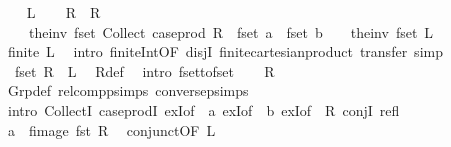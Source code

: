 \begin{isabellebody}
%
\isadelimproof
%
\endisadelimproof
%
\isatagproof
{}\isamarkupfalse%
\isanewline
\ \ \isamarkupfalse%
\ {\isacharquery}L\isanewline
\ \ \isamarkupfalse%
\ R{\isacharprime}\ \ {\isachardoublequoteopen}R{\isacharprime}\ {\isacharequal}\isanewline
\ \ \ \ the{\isacharunderscore}inv\ fset\ {\isacharparenleft}Collect\ {\isacharparenleft}case{\isacharunderscore}prod\ R{\isacharparenright}\ {\isasyminter}\ {\isacharparenleft}fset\ a\ {\isasymtimes}\ fset\ b{\isacharparenright}{\isacharparenright}{\isachardoublequoteclose}\ {\isacharparenleft}\ {\isachardoublequoteopen}{\isacharunderscore}\ {\isacharequal}\ the{\isacharunderscore}inv\ fset\ {\isacharquery}L{\isacharprime}{\isachardoublequoteclose}{\isacharparenright}\isanewline
\ \ \isamarkupfalse%
\ {\isachardoublequoteopen}finite\ {\isacharquery}L{\isacharprime}{\isachardoublequoteclose}\ \isamarkupfalse%
\ {\isacharparenleft}intro\ finite{\isacharunderscore}Int{\isacharbrackleft}OF\ disjI{}{\isacharbrackright}\ finite{\isacharunderscore}cartesian{\isacharunderscore}product{\isacharparenright}\ {\isacharparenleft}transfer{\isacharcomma}\ simp{\isacharparenright}{\isacharplus}\isanewline
\ \ \isamarkupfalse%
\ {\isacharasterisk}{\isacharcolon}\ {\isachardoublequoteopen}fset\ R{\isacharprime}\ {\isacharequal}\ {\isacharquery}L{\isacharprime}{\isachardoublequoteclose}\ \isamarkupfalse%
\ R{\isacharprime}{\isacharunderscore}def\ \isamarkupfalse%
\ {\isacharparenleft}intro\ fset{\isacharunderscore}to{\isacharunderscore}fset{\isacharparenright}\isanewline
\ \ \isamarkupfalse%
\ {\isacharquery}R\ \isamarkupfalse%
\ Grp{\isacharunderscore}def\ relcompp{\isachardot}simps\ conversep{\isachardot}simps\isanewline
\ \ \isamarkupfalse%
\ {\isacharparenleft}intro\ CollectI\ case{\isacharunderscore}prodI\ exI{\isacharbrackleft}of\ {\isacharunderscore}\ a{\isacharbrackright}\ exI{\isacharbrackleft}of\ {\isacharunderscore}\ b{\isacharbrackright}\ exI{\isacharbrackleft}of\ {\isacharunderscore}\ R{\isacharprime}{\isacharbrackright}\ conjI\ refl{\isacharparenright}\isanewline
\ \ \ \ \isamarkupfalse%
\ {\isacharasterisk}\ \isamarkupfalse%
\ {\isachardoublequoteopen}a\ {\isacharequal}\ fimage\ fst\ R{\isacharprime}{\isachardoublequoteclose}\ \isamarkupfalse%
\ conjunct{}{\isacharbrackleft}OF\ {\isacartoucheopen}{\isacharquery}L{\isacartoucheclose}{\isacharbrackright}\isanewline

\end{isabellebody}
